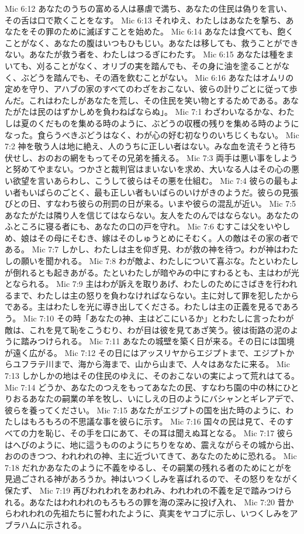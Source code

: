 Mic 6:12  あなたのうちの富める人は暴虐で満ち、あなたの住民は偽りを言い、その舌は口で欺くことをなす。
Mic 6:13  それゆえ、わたしはあなたを撃ち、あなたをその罪のために滅ぼすことを始めた。
Mic 6:14  あなたは食べても、飽くことがなく、あなたの腹はいつもひもじい。あなたは移しても、救うことができない。あなたが救う者を、わたしはつるぎにわたす。
Mic 6:15  あなたは種をまいても、刈ることがなく、オリブの実を踏んでも、その身に油を塗ることがなく、ぶどうを踏んでも、その酒を飲むことがない。
Mic 6:16  あなたはオムリの定めを守り、アハブの家のすべてのわざをおこない、彼らの計りごとに従って歩んだ。これはわたしがあなたを荒し、その住民を笑い物とするためである。あなたがたは民のはずかしめを負わねばならぬ」。
Mic 7:1  わざわいなるかな、わたしは夏のくだものを集める時のように、ぶどうの収穫の残りを集める時のようになった。食らうべきぶどうはなく、わが心の好む初なりのいちじくもない。
Mic 7:2  神を敬う人は地に絶え、人のうちに正しい者はない。みな血を流そうと待ち伏せし、おのおの網をもってその兄弟を捕える。
Mic 7:3  両手は悪い事をしようと努めてやまない。つかさと裁判官はまいないを求め、大いなる人はその心の悪い欲望を言いあらわし、こうして彼らはその悪を仕組む。
Mic 7:4  彼らの最もよい者もいばらのごとく、最も正しい者もいばらのいけがきのようだ。彼らの見張びとの日、すなわち彼らの刑罰の日が来る。いまや彼らの混乱が近い。
Mic 7:5  あなたがたは隣り人を信じてはならない。友人をたのんではならない。あなたのふところに寝る者にも、あなたの口の戸を守れ。
Mic 7:6  むすこは父をいやしめ、娘はその母にそむき、嫁はそのしゅうとめにそむく。人の敵はその家の者である。
Mic 7:7  しかし、わたしは主を仰ぎ見、わが救の神を待つ。わが神はわたしの願いを聞かれる。
Mic 7:8  わが敵よ、わたしについて喜ぶな。たといわたしが倒れるとも起きあがる。たといわたしが暗やみの中にすわるとも、主はわが光となられる。
Mic 7:9  主はわが訴えを取りあげ、わたしのためにさばきを行われるまで、わたしは主の怒りを負わなければならない。主に対して罪を犯したからである。主はわたしを光に導き出してくださる。わたしは主の正義を見るであろう。
Mic 7:10  その時「あなたの神、主はどこにいるか」とわたしに言ったわが敵は、これを見て恥をこうむり、わが目は彼を見てあざ笑う。彼は街路の泥のように踏みつけられる。
Mic 7:11  あなたの城壁を築く日が来る。その日には国境が遠く広がる。
Mic 7:12  その日にはアッスリヤからエジプトまで、エジプトからユフラテ川まで、海から海まで、山から山まで、人々はあなたに来る。
Mic 7:13  しかしかの地はその住民のゆえに、そのおこないの実によって荒れはてる。
Mic 7:14  どうか、あなたのつえをもってあなたの民、すなわち園の中の林にひとりおるあなたの嗣業の羊を牧し、いにしえの日のようにバシャンとギレアデで、彼らを養ってください。
Mic 7:15  あなたがエジプトの国を出た時のように、わたしはもろもろの不思議な事を彼らに示す。
Mic 7:16  国々の民は見て、そのすべての力を恥じ、その手を口にあて、その耳は聞えぬ耳となる。
Mic 7:17  彼らはへびのように、地に這うもののようにちりをなめ、震えながらその城から出、おののきつつ、われわれの神、主に近づいてきて、あなたのために恐れる。
Mic 7:18  だれかあなたのように不義をゆるし、その嗣業の残れる者のためにとがを見過ごされる神があろうか。神はいつくしみを喜ばれるので、その怒りをながく保たず、
Mic 7:19  再びわれわれをあわれみ、われわれの不義を足で踏みつけられる。あなたはわれわれのもろもろの罪を海の深みに投げ入れ、
Mic 7:20  昔からわれわれの先祖たちに誓われたように、真実をヤコブに示し、いつくしみをアブラハムに示される。


